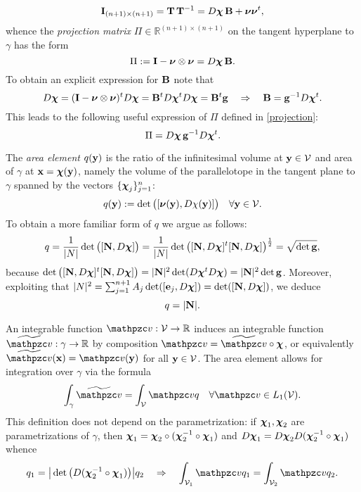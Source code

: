 %
\[
{\bf I}_{(n+1)\times(n+1)} = {\bf T} \, {\bf T}^{-1} = D{\boldsymbol \chi} \, {\bf B} + {\boldsymbol \nu} {\boldsymbol \nu}^t,
\]
%
whence the {\it projection matrix} $\Pi \in \mathbb{R}^{(n+1)\times(n+1)}$ on the tangent
hyperplane to $\gamma$ has the form
%
\begin{equation}\label{projection}
\Pi := {\bf I} - {\boldsymbol \nu}\otimes{\boldsymbol \nu} = D{\boldsymbol \chi} \, {\bf B} .
\end{equation}
%
To obtain an explicit expression for ${\bf B}$ note that
%
\[
D{\boldsymbol \chi} = ({\bf I} - {\boldsymbol \nu}\otimes{\boldsymbol \nu})^t D{\boldsymbol \chi} = {\bf B}^t D{\boldsymbol \chi}^t D{\boldsymbol \chi} = {\bf B}^t {\bf g}
\quad\Rightarrow\quad
{\bf B} = {\bf g}^{-1} D{\boldsymbol \chi}^t.
\]
%
This leads to the following useful expression of $\Pi$ defined in \eqref{projection}:
%
\begin{equation}\label{projection-b}
\Pi = D{\boldsymbol \chi} \, {\bf g}^{-1} D{\boldsymbol \chi}^t.
\end{equation}

The {\it area element} $q({\bf y})$ is the ratio of the
infinitesimal volume at ${\bf y}\in\mathcal{V}$
and area of $\gamma$ at ${\bf x}={\boldsymbol \chi}({\bf y})$, namely the volume of the parallelotope
in the tangent plane to $\gamma$ spanned by the vectors $\{{\boldsymbol \chi}_j\}_{j=1}^n$:
%
\begin{equation}\label{e:area-rep}
q({\bf y}) := \det \big([{\boldsymbol \nu}({\bf y}), D\chi({\bf y})] \big)
\quad\forall {\bf y}\in\mathcal{V}.
\end{equation}
%
To obtain a more familiar form of $q$ we argue as follows:
%
\begin{equation}\label{area-prelim}
  q = \frac{1}{|N|} \det \big([{\bf N}, D{\boldsymbol \chi}] \big) =
  \frac{1}{|N|} \det\big( [{\bf N},D{\boldsymbol \chi}]^t [{\bf N},D{\boldsymbol \chi}]  \big)^{\frac12} = \sqrt{\det {\bf g}},
\end{equation}
%
because $\det\big( [{\bf N},D{\boldsymbol \chi}]^t [{\bf N},D{\boldsymbol \chi}]  \big) =
|{\bf N}|^2 \det(D{\boldsymbol \chi}^t D{\boldsymbol \chi}) = |{\bf N}|^2 \det {\bf g}$. Moreover, exploiting that
$|N|^2 = \sum_{j=1}^{n+1} A_j \det([{\bf e}_j,D{\boldsymbol \chi}]) = \det([{\bf N},D{\boldsymbol \chi}])$, we deduce
%
\begin{equation}\label{q-N}
q = |{\bf N}|.
\end{equation}  

An integrable function $\tv:\mathcal{V}\to\mathbb{R}$ induces an integrable function
$\widetilde{\tv}:\gamma\to\mathbb{R}$ by composition $\tv = \widetilde{\tv}\circ\bchi$,
or equivalently $\widetilde{\tv}(\bx) = \tv(\by)$ for all ${\bf y}\in\mathcal{V}$.
The area element allows for integration over $\gamma$ via the formula
%
\begin{equation}\label{int-gamma}
  \int_\gamma \widetilde \tv = \int_{\mathcal V} \tv q
  \quad\forall \tv \in L_1(\mathcal V).
\end{equation}
%
This definition does not depend on the parametrization: if ${\boldsymbol \chi}_1,{\boldsymbol \chi}_2$
are parametrizations of $\gamma$, then
${\boldsymbol \chi}_1={\boldsymbol \chi}_2 \circ ({\boldsymbol \chi}_2^{-1}\circ{\boldsymbol \chi}_1)$ and
$D{\boldsymbol \chi}_1=D{\boldsymbol \chi}_2 D({\boldsymbol \chi}_2^{-1}\circ{\boldsymbol \chi}_1)$ whence
%
\[
q_1 = \big|\det\big(D(\bchi_2^{-1}\circ\bchi_1)\big)\big| q_2
\quad\Rightarrow\quad
\int_{\mathcal{V}_1} \tv q_1 = \int_{\mathcal{V}_2} \tv q_2. 
\]
 

